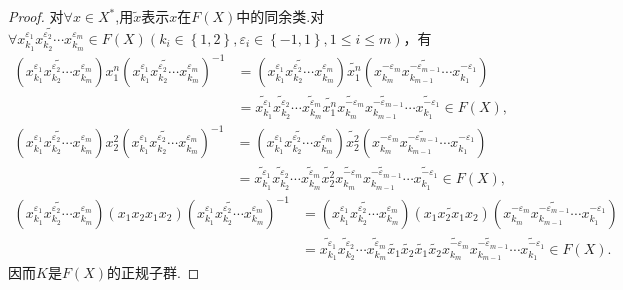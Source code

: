 \documentclass[../../main.tex]{subfiles}%
\begin{document}
\begin{proof}
对$\forall x\in X^*$,用$\widetilde{x}\text{表示}x\text{在}F\left( X \right) \text{中的同余类}$.对$\forall \widetilde{x_{k_1}^{\varepsilon _1}x_{k_2}^{\varepsilon _2}\cdots x_{k_m}^{\varepsilon _m}}\in F\left( X \right) \left( k_i\in \left\{ 1,2 \right\}, \varepsilon _i\in \left\{ -1,1 \right\}, 1\leqslant i\leqslant m \right)$，有
\begin{align*}
\left( \widetilde{x_{k_1}^{\varepsilon _1}x_{k_2}^{\varepsilon _2}\cdots x_{k_m}^{\varepsilon _m}} \right) x_{1}^{n}\left( \widetilde{x_{k_1}^{\varepsilon _1}x_{k_2}^{\varepsilon _2}\cdots x_{k_m}^{\varepsilon _m}} \right) ^{-1}&=\left( \widetilde{x_{k_1}^{\varepsilon _1}x_{k_2}^{\varepsilon _2}\cdots x_{k_m}^{\varepsilon _m}} \right) \widetilde{x_{1}^{n}}\left( \widetilde{x_{k_m}^{-\varepsilon _m}x_{k_{m-1}}^{-\varepsilon _{m-1}}\cdots x_{k_1}^{-\varepsilon _1}} \right) 
\\
&=\widetilde{x_{k_1}^{\varepsilon _1}}\widetilde{x_{k_2}^{\varepsilon _2}}\cdots \widetilde{x_{k_m}^{\varepsilon _m}}\widetilde{x_{1}^{n}}\widetilde{x_{k_m}^{-\varepsilon _m}}\widetilde{x_{k_{m-1}}^{-\varepsilon _{m-1}}}\cdots \widetilde{x_{k_1}^{-\varepsilon _1}}\in F\left( X \right) ,
\end{align*}
\begin{align*}
\left( \widetilde{x_{k_1}^{\varepsilon _1}x_{k_2}^{\varepsilon _2}\cdots x_{k_m}^{\varepsilon _m}} \right) x_{2}^{2}\left( \widetilde{x_{k_1}^{\varepsilon _1}x_{k_2}^{\varepsilon _2}\cdots x_{k_m}^{\varepsilon _m}} \right) ^{-1}&=\left( \widetilde{x_{k_1}^{\varepsilon _1}x_{k_2}^{\varepsilon _2}\cdots x_{k_m}^{\varepsilon _m}} \right) \widetilde{x_{2}^{2}}\left( \widetilde{x_{k_m}^{-\varepsilon _m}x_{k_{m-1}}^{-\varepsilon _{m-1}}\cdots x_{k_1}^{-\varepsilon _1}} \right) 
\\
&=\widetilde{x_{k_1}^{\varepsilon _1}}\widetilde{x_{k_2}^{\varepsilon _2}}\cdots \widetilde{x_{k_m}^{\varepsilon _m}}\widetilde{x_{2}^{2}}\widetilde{x_{k_m}^{-\varepsilon _m}}\widetilde{x_{k_{m-1}}^{-\varepsilon _{m-1}}}\cdots \widetilde{x_{k_1}^{-\varepsilon _1}}\in F\left( X \right) ,
\end{align*}
\begin{align*}
\left( \widetilde{x_{k_1}^{\varepsilon _1}x_{k_2}^{\varepsilon _2}\cdots x_{k_m}^{\varepsilon _m}} \right) \left( x_1x_2x_1x_2 \right) \left( \widetilde{x_{k_1}^{\varepsilon _1}x_{k_2}^{\varepsilon _2}\cdots x_{k_m}^{\varepsilon _m}} \right) ^{-1}&=\left( \widetilde{x_{k_1}^{\varepsilon _1}x_{k_2}^{\varepsilon _2}\cdots x_{k_m}^{\varepsilon _m}} \right) \left( \widetilde{x_1x_2x_1x_2} \right) \left( \widetilde{x_{k_m}^{-\varepsilon _m}x_{k_{m-1}}^{-\varepsilon _{m-1}}\cdots x_{k_1}^{-\varepsilon _1}} \right) 
\\
&=\widetilde{x_{k_1}^{\varepsilon _1}}\widetilde{x_{k_2}^{\varepsilon _2}}\cdots \widetilde{x_{k_m}^{\varepsilon _m}}\widetilde{x_1}\widetilde{x_2}\widetilde{x_1}\widetilde{x_2}\widetilde{x_{k_m}^{-\varepsilon _m}}\widetilde{x_{k_{m-1}}^{-\varepsilon _{m-1}}}\cdots \widetilde{x_{k_1}^{-\varepsilon _1}}\in F\left( X \right) .
\end{align*}
因而$K$是$F(X)$的正规子群.


\end{proof}
\end{document}
